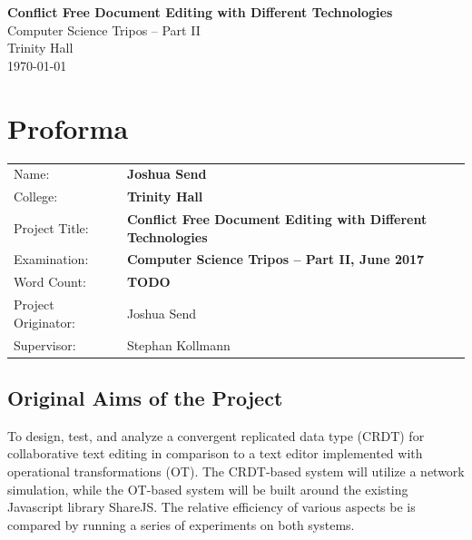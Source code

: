 \documentclass[12pt,a4paper,twoside,openright]{report}
\begin{document}


\pagestyle{empty}


\vspace*{60mm}
\begin{center}
\Huge
\textbf{Conflict Free Document Editing with Different Technologies} \\[5mm]
Computer Science Tripos -- Part II \\[5mm]
Trinity Hall \\[5mm]
\today  %
\end{center}


\pagestyle{plain}

\chapter*{Proforma}

{\large
\begin{tabular}{ll}
Name:               & \bf Joshua Send                       \\
College:            & \bf Trinity Hall                     \\
Project Title:      & \bf Conflict Free Document Editing with Different Technologies \\
Examination:        & \bf Computer Science Tripos -- Part II, June 2017  \\
Word Count:         & \bf TODO			\\
Project Originator: & Joshua Send                    \\
Supervisor:         & Stephan Kollmann                    \\ 
\end{tabular}
}


\section*{Original Aims of the Project}

To design, test, and analyze a convergent replicated data type (CRDT) for collaborative text editing in comparison to a text editor implemented with operational transformations (OT). The CRDT-based system will utilize a network simulation, while the OT-based system will be built around the existing Javascript library ShareJS. The relative efficiency of various aspects be is compared by running a series of experiments on both systems.
\end{document}

